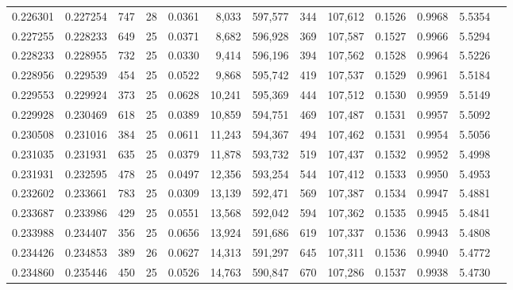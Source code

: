 \begin{tabular}{rrrrrrrrrrrrr}
0.226301 & 0.227254 & 747 &  28 &                                     0.0361 &   8,033 & 597,577 &     344 & 107,612 & 0.1526 & 0.9968 & 5.5354 \\
0.227255 & 0.228233 & 649 &  25 &                                     0.0371 &   8,682 & 596,928 &     369 & 107,587 & 0.1527 & 0.9966 & 5.5294 \\
0.228233 & 0.228955 & 732 &  25 &                                     0.0330 &   9,414 & 596,196 &     394 & 107,562 & 0.1528 & 0.9964 & 5.5226 \\
0.228956 & 0.229539 & 454 &  25 &                                     0.0522 &   9,868 & 595,742 &     419 & 107,537 & 0.1529 & 0.9961 & 5.5184 \\
0.229553 & 0.229924 & 373 &  25 &                                     0.0628 &  10,241 & 595,369 &     444 & 107,512 & 0.1530 & 0.9959 & 5.5149 \\
0.229928 & 0.230469 & 618 &  25 &                                     0.0389 &  10,859 & 594,751 &     469 & 107,487 & 0.1531 & 0.9957 & 5.5092 \\
0.230508 & 0.231016 & 384 &  25 &                                     0.0611 &  11,243 & 594,367 &     494 & 107,462 & 0.1531 & 0.9954 & 5.5056 \\
0.231035 & 0.231931 & 635 &  25 &                                     0.0379 &  11,878 & 593,732 &     519 & 107,437 & 0.1532 & 0.9952 & 5.4998 \\
0.231931 & 0.232595 & 478 &  25 &                                     0.0497 &  12,356 & 593,254 &     544 & 107,412 & 0.1533 & 0.9950 & 5.4953 \\
0.232602 & 0.233661 & 783 &  25 &                                     0.0309 &  13,139 & 592,471 &     569 & 107,387 & 0.1534 & 0.9947 & 5.4881 \\
0.233687 & 0.233986 & 429 &  25 &                                     0.0551 &  13,568 & 592,042 &     594 & 107,362 & 0.1535 & 0.9945 & 5.4841 \\
0.233988 & 0.234407 & 356 &  25 &                                     0.0656 &  13,924 & 591,686 &     619 & 107,337 & 0.1536 & 0.9943 & 5.4808 \\
0.234426 & 0.234853 & 389 &  26 &                                     0.0627 &  14,313 & 591,297 &     645 & 107,311 & 0.1536 & 0.9940 & 5.4772 \\
0.234860 & 0.235446 & 450 &  25 &                                     0.0526 &  14,763 & 590,847 &     670 & 107,286 & 0.1537 & 0.9938 & 5.4730 \\

\end{tabular}
